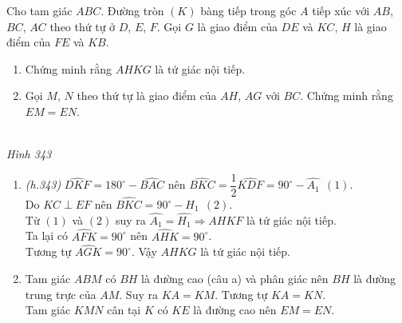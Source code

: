 \begin{bt}
 Cho tam giác $ABC$. Đường tròn $(K)$ bàng tiếp trong góc $A$ tiếp xúc với $AB$, $BC$, $AC$ theo thứ tự ở $D$, $E$, $F$. Gọi $G$ là giao điểm của $DE$ và $KC$, $H$ là giao điểm của $FE$ và $KB$.
 \begin{enumerate}
  \item Chứng minh rằng $AHKG$ là tứ giác nội tiếp.
  \item Gọi $M$, $N$ theo thứ tự là giao điểm của $AH$, $AG$ với $BC$. Chứng minh rằng $EM=EN$.
 \end{enumerate}
 \loigiai
  {
  \begin{center}
   \\
  \textit{Hình 343}
  \end{center}
  \begin{enumerate}
	\item \textit{(h.343)} $\widehat{DKF}=180^\circ -\widehat{BAC}$ nên $\widehat{BKC}= \dfrac{1}{2}\widehat{KDF}=90^ \circ - \widehat{A_1} \ \ (1)$.\\
	Do $KC \perp EF$ nên $\widehat{BKC}=90^ \circ - H_1 \ \ (2)$.\\
	Từ $(1)$ và $(2)$ suy ra $\widehat{A_1}=\widehat{H_1} \Rightarrow AHKF$ là tứ giác nội tiếp.\\
	Ta lại có $\widehat{AFK}=90^ \circ$ nên $\widehat{AHK}=90^\circ$.\\
	Tương tự $\widehat{AGK}=90^ \circ$. Vậy $AHKG$ là tứ giác nội tiếp.
	\item Tam giác $ABM$ có $BH$ là đường cao (câu a) và phân giác nên $BH$ là đường trung trực của $AM$. Suy ra $KA=KM$. Tương tự $KA=KN$.\\
	Tam giác $KMN$ cân tại $K$ có $KE$ là đường cao nên $EM=EN$.
  \end{enumerate}	
	}
\end{bt}

